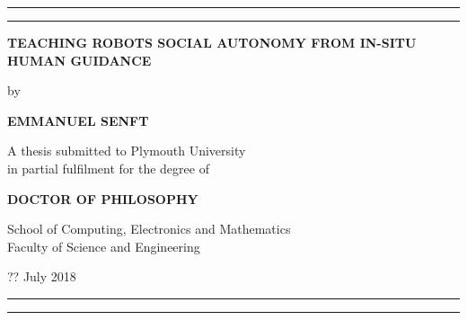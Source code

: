 {\centering
\rule{\textwidth}{1pt}\par %
\vspace{2pt}\vspace{-\baselineskip} %
\rule{\textwidth}{0.4pt}\par %

\vspace*{4\baselineskip}
\centering
\textbf{TEACHING ROBOTS SOCIAL AUTONOMY FROM IN-SITU HUMAN GUIDANCE}
\vspace*{2\baselineskip}

by
\vspace*{2\baselineskip}

\textbf{EMMANUEL SENFT}
\vspace*{6\baselineskip}

A thesis submitted to Plymouth University\\
in partial fulfilment for the degree of
\vspace*{2\baselineskip}

\textbf{DOCTOR OF PHILOSOPHY}
\vfill

School of Computing, Electronics and Mathematics\\
Faculty of Science and Engineering
\vspace*{2\baselineskip}

?? July 2018

\rule{\textwidth}{0.4pt}\par %
\vspace{2pt}\vspace{-\baselineskip} %
\rule{\textwidth}{1pt}\par} %
